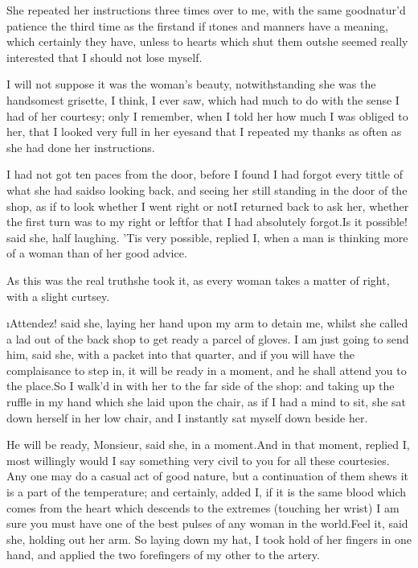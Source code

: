 \documentclass[twoside]{article}
\begin{document}
She repeated her instructions three times over to me, with the same
goodnatur’d patience the third time as the first\tsk and if \i{tones and
manners} have a meaning, which certainly they have, unless to hearts
which shut them out\tsk she seemed really interested that I should not lose
myself.

I will not suppose it was the woman’s beauty, notwithstanding she was the
handsomest grisette, I think, I ever saw, which had much to do with the
sense I had of her courtesy; only I remember, when I told her how much I
was obliged to her, that I looked very full in her eyes\tsk and that I
repeated my thanks as often as she had done her instructions.

I had not got ten paces from the door, before I found I had forgot every
tittle of what she had said\tsk so looking back, and seeing her still
standing in the door of the shop, as if to look whether I went right or
not\tsk I returned back to ask her, whether the first turn was to my right
or left\tsk for that I had absolutely forgot.\tsk Is it possible! said she, half
laughing.  ’Tis very possible, replied I, when a man is thinking more of
a woman than of her good advice.

As this was the real truth\tsk she took it, as every woman takes a matter of
right, with a slight curtsey.

\tsk \i{Attendez!} said she, laying her hand upon my arm to detain me, whilst
she called a lad out of the back shop to get ready a parcel of gloves.  I
am just going to send him, said she, with a packet into that quarter, and
if you will have the complaisance to step in, it will be ready in a
moment, and he shall attend you to the place.\tsk So I walk’d in with her to
the far side of the shop: and taking up the ruffle in my hand which she
laid upon the chair, as if I had a mind to sit, she sat down herself in
her low chair, and I instantly sat myself down beside her.

\tsk He will be ready, Monsieur, said she, in a moment.\tsk And in that moment,
replied I, most willingly would I say something very civil to you for all
these courtesies.  Any one may do a casual act of good nature, but a
continuation of them shews it is a part of the temperature; and
certainly, added I, if it is the same blood which comes from the heart
which descends to the extremes (touching her wrist) I am sure you must
have one of the best pulses of any woman in the world.\tsk Feel it, said she,
holding out her arm.  So laying down my hat, I took hold of her fingers
in one hand, and applied the two forefingers of my other to the artery.\tsk 
\end{document}
